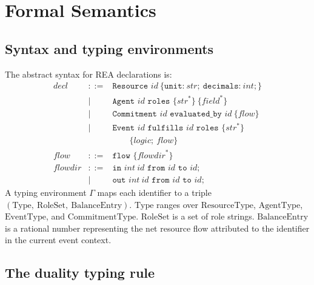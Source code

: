 \documentclass[11pt,a4paper]{article}
\theoremstyle{remark}
\begin{document}
\section{Formal Semantics}\label{sec:semantics}

\subsection{Syntax and typing environments}

The abstract syntax for REA declarations is:
\[
\begin{array}{rcl}
\mathit{decl} & ::= & \texttt{Resource } \mathit{id}\ \{ \texttt{unit:}\ \mathit{str};\ \texttt{decimals:}\ \mathit{int}; \} \\
              & \mid & \texttt{Agent } \mathit{id} \texttt{ roles } \{ \mathit{str}^{*} \}\ \{ \mathit{field}^{*} \} \\
              & \mid & \texttt{Commitment } \mathit{id} \texttt{ evaluated\_by } \mathit{id}\ \{ \mathit{flow} \} \\
              & \mid & \texttt{Event } \mathit{id} \texttt{ fulfills } \mathit{id} \texttt{ roles } \{ \mathit{str}^{*} \} \\
              &      & \qquad \{ \mathit{logic};\ \mathit{flow} \} \\[0.5ex]
\mathit{flow} & ::= & \texttt{flow }\{ \mathit{flowdir}^{*} \} \\
\mathit{flowdir} & ::= & \texttt{in } \mathit{int}\ \mathit{id} \texttt{ from } \mathit{id} \texttt{ to } \mathit{id}; \\
                 & \mid & \texttt{out } \mathit{int}\ \mathit{id} \texttt{ from } \mathit{id} \texttt{ to } \mathit{id};
\end{array}
\]
A typing environment $\Gamma$ maps each identifier to a triple
$(\mathrm{Type},\ \mathrm{RoleSet},\ \mathrm{BalanceEntry})$.
$\mathrm{Type}$ ranges over $\mathrm{ResourceType}$,
$\mathrm{AgentType}$, $\mathrm{EventType}$, and
$\mathrm{CommitmentType}$. $\mathrm{RoleSet}$ is a set of role strings.
$\mathrm{BalanceEntry}$ is a rational number representing the net
resource flow attributed to the identifier in the current event
context.

\subsection{The duality typing rule}
\end{document}

